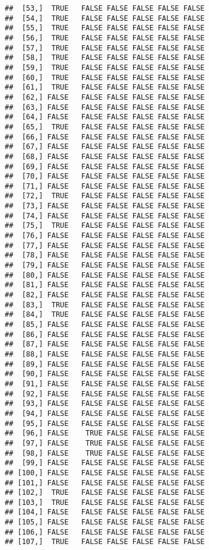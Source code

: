\documentclass[
]{article}
\begin{document}
\begin{verbatim}
##  [53,]  TRUE   FALSE FALSE FALSE FALSE FALSE
##  [54,]  TRUE   FALSE FALSE FALSE FALSE FALSE
##  [55,]  TRUE   FALSE FALSE FALSE FALSE FALSE
##  [56,]  TRUE   FALSE FALSE FALSE FALSE FALSE
##  [57,]  TRUE   FALSE FALSE FALSE FALSE FALSE
##  [58,]  TRUE   FALSE FALSE FALSE FALSE FALSE
##  [59,]  TRUE   FALSE FALSE FALSE FALSE FALSE
##  [60,]  TRUE   FALSE FALSE FALSE FALSE FALSE
##  [61,]  TRUE   FALSE FALSE FALSE FALSE FALSE
##  [62,] FALSE   FALSE FALSE FALSE FALSE FALSE
##  [63,] FALSE   FALSE FALSE FALSE FALSE FALSE
##  [64,] FALSE   FALSE FALSE FALSE FALSE FALSE
##  [65,]  TRUE   FALSE FALSE FALSE FALSE FALSE
##  [66,] FALSE   FALSE FALSE FALSE FALSE FALSE
##  [67,] FALSE   FALSE FALSE FALSE FALSE FALSE
##  [68,] FALSE   FALSE FALSE FALSE FALSE FALSE
##  [69,] FALSE   FALSE FALSE FALSE FALSE FALSE
##  [70,] FALSE   FALSE FALSE FALSE FALSE FALSE
##  [71,] FALSE   FALSE FALSE FALSE FALSE FALSE
##  [72,]  TRUE   FALSE FALSE FALSE FALSE FALSE
##  [73,] FALSE   FALSE FALSE FALSE FALSE FALSE
##  [74,] FALSE   FALSE FALSE FALSE FALSE FALSE
##  [75,]  TRUE   FALSE FALSE FALSE FALSE FALSE
##  [76,] FALSE   FALSE FALSE FALSE FALSE FALSE
##  [77,] FALSE   FALSE FALSE FALSE FALSE FALSE
##  [78,] FALSE   FALSE FALSE FALSE FALSE FALSE
##  [79,] FALSE   FALSE FALSE FALSE FALSE FALSE
##  [80,] FALSE   FALSE FALSE FALSE FALSE FALSE
##  [81,] FALSE   FALSE FALSE FALSE FALSE FALSE
##  [82,] FALSE   FALSE FALSE FALSE FALSE FALSE
##  [83,]  TRUE   FALSE FALSE FALSE FALSE FALSE
##  [84,]  TRUE   FALSE FALSE FALSE FALSE FALSE
##  [85,] FALSE   FALSE FALSE FALSE FALSE FALSE
##  [86,] FALSE   FALSE FALSE FALSE FALSE FALSE
##  [87,] FALSE   FALSE FALSE FALSE FALSE FALSE
##  [88,] FALSE   FALSE FALSE FALSE FALSE FALSE
##  [89,] FALSE   FALSE FALSE FALSE FALSE FALSE
##  [90,] FALSE   FALSE FALSE FALSE FALSE FALSE
##  [91,] FALSE   FALSE FALSE FALSE FALSE FALSE
##  [92,] FALSE   FALSE FALSE FALSE FALSE FALSE
##  [93,] FALSE   FALSE FALSE FALSE FALSE FALSE
##  [94,] FALSE   FALSE FALSE FALSE FALSE FALSE
##  [95,] FALSE   FALSE FALSE FALSE FALSE FALSE
##  [96,] FALSE    TRUE FALSE FALSE FALSE FALSE
##  [97,] FALSE    TRUE FALSE FALSE FALSE FALSE
##  [98,] FALSE    TRUE FALSE FALSE FALSE FALSE
##  [99,] FALSE   FALSE FALSE FALSE FALSE FALSE
## [100,] FALSE   FALSE FALSE FALSE FALSE FALSE
## [101,] FALSE   FALSE FALSE FALSE FALSE FALSE
## [102,]  TRUE   FALSE FALSE FALSE FALSE FALSE
## [103,]  TRUE   FALSE FALSE FALSE FALSE FALSE
## [104,] FALSE   FALSE FALSE FALSE FALSE FALSE
## [105,] FALSE   FALSE FALSE FALSE FALSE FALSE
## [106,] FALSE   FALSE FALSE FALSE FALSE FALSE
## [107,]  TRUE   FALSE FALSE FALSE FALSE FALSE

\end{verbatim}
\end{document}
